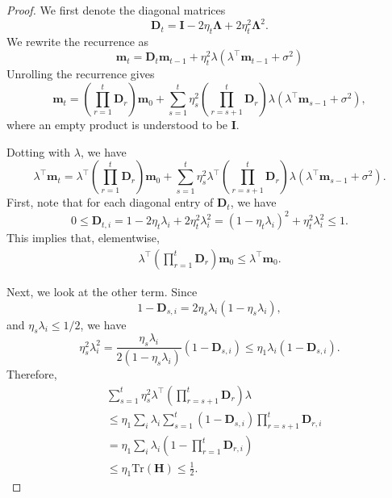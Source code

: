 \documentclass{article}
\def\m{{\mathbf{m}}}
\def\H{{\mathbf{H}}}
\def\D{{\mathbf{D}}}
\def\H{{\mathbf{H}}}
\def\I{{\mathbf{I}}}
\def\LLambda{{\mathbf{\Lambda}}}
\def\tr{\text{Tr}}
\def\m{{\mathbf{m}}}
\def\H{{\mathbf{H}}}
\def\D{{\mathbf{D}}}
\def\H{{\mathbf{H}}}
\def\LLambda{{\mathbf{\Lambda}}}
\def\tr{\text{Tr}}
\def\I{\mathbf{I}}
\theoremstyle{plain}
\def\m{{\mathbf{m}}}
\def\H{{\mathbf{H}}}
\def\I{{\mathbf{I}}}
\def\LLambda{{\mathbf{\Lambda}}}
\begin{document}
\begin{proof}
    We first denote the diagonal matrices
    \[
    \D_t
    =
    \I
    - 2 \eta_t \LLambda
    + 2 \eta_t^2 \LLambda^2.
    \]
    We rewrite the recurrence as
    \[
    \m_t
    =
    \D_t \m_{t-1}
    + \eta_t^2 \lambda
    (\lambda^\top \m_{t-1} + \sigma^2)
    \]
    Unrolling the recurrence gives
    \[
    \m_t
    =
    \left(\prod_{r=1}^t \D_r\right)\m_0
    +
    \sum_{s=1}^t
    \eta_s^2
    \left(\prod_{r=s+1}^t \D_r\right)
    \lambda
    (\lambda^\top \m_{s-1} + \sigma^2),
    \]
    where an empty product is understood to be $\I$.

    Dotting with $\lambda$, we have
    \[
    \lambda^\top \m_t
    =
    \lambda^\top
    \left(\prod_{r=1}^t \D_r\right)\m_0
    +
    \sum_{s=1}^t
    \eta_s^2
    \lambda^\top
    \left(\prod_{r=s+1}^t \D_r\right)
    \lambda
    (\lambda^\top \m_{s-1} + \sigma^2).
    \]
    First, note that for each diagonal entry of $\D_t$, we have
    \[
    0
    \leq
    \D_{t,i}
    =
    1 - 2\eta_t\lambda_i + 2\eta_t^2\lambda_i^2
    =
    (1-\eta_t\lambda_i)^2 + \eta_t^2\lambda_i^2
    \leq 1.
    \]
    This implies that, elementwise,
    \begin{align}
        \label{eqn:first_thing}
        \lambda^\top
        \left(\prod_{r=1}^t \D_r\right)\m_0
        \leq
        \lambda^\top \m_0.
    \end{align}

    Next, we look at the other term. Since
    \[
    1-\D_{s,i}
    =
    2\eta_s\lambda_i(1-\eta_s\lambda_i),
    \]
    and $\eta_s\lambda_i\leq 1/2$, we have
    \[
    \eta_s^2\lambda_i^2
    =
    \frac{\eta_s\lambda_i}
         {2(1-\eta_s\lambda_i)}
    (1-\D_{s,i})
    \leq
    \eta_1\lambda_i(1-\D_{s,i}).
    \]
    Therefore,
    \begin{align}
        \label{eqn:second_thing}
        &
        \sum_{s=1}^t
        \eta_s^2
        \lambda^\top
        \left(\prod_{r=s+1}^t \D_r\right)
        \lambda
        \nonumber\\
        &\leq
        \eta_1
        \sum_i \lambda_i
        \sum_{s=1}^t
        (1-\D_{s,i})
        \prod_{r=s+1}^t \D_{r,i}
        \nonumber\\
        &=
        \eta_1
        \sum_i \lambda_i
        \left(
            1-\prod_{r=1}^t \D_{r,i}
        \right)\\
        &\leq
        \eta_1 \tr(\H)
        \leq
        \frac{1}{2}.
    \end{align}


\end{proof}
\end{document}
